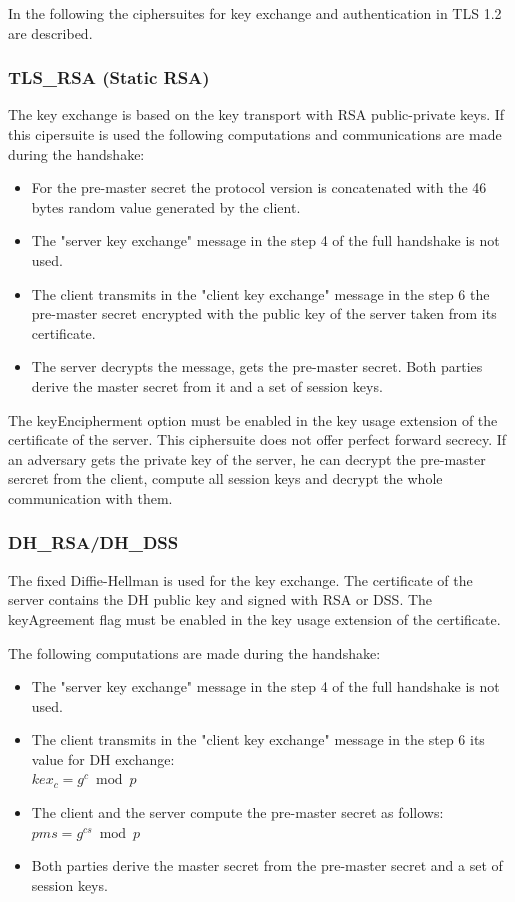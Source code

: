 In the following the ciphersuites for key exchange and authentication in TLS 1.2 are described.

\subsubsection*{TLS\_RSA (Static RSA)} 
The key exchange is based on the key transport with RSA public-private keys.
If this cipersuite is used the following computations and communications are made during the handshake:
\begin{itemize}
	\item For the pre-master secret the protocol version is concatenated with the 46 bytes random value generated by the client.
	\item The "server key exchange" message in the step 4 of the full handshake is not used.
	\item The client transmits in the "client key exchange" message in the step 6 the pre-master secret encrypted with the public key of the server taken from its certificate.
	\item The server decrypts the message, gets the pre-master secret. Both parties derive the master secret from it and a set of session keys.
\end{itemize}

The keyEncipherment option must be enabled in the key usage extension of the certificate of the server.
This ciphersuite does not offer perfect forward secrecy. If an adversary gets the private key of the server, he can decrypt the pre-master sercret from the client, compute all session keys and decrypt the whole communication with them.

\subsubsection*{DH\_RSA/DH\_DSS}
The fixed Diffie-Hellman is used for the key exchange. The certificate of the server contains the DH public key and signed with RSA or DSS.
The keyAgreement flag must be enabled in the key usage extension of the certificate.

The following computations are made during the handshake:
\begin{itemize}
	\item The "server key exchange" message in the step 4 of the full handshake is not used.
	\item The client transmits in the "client key exchange" message in the step 6 its value for DH exchange: \\ $\displaystyle kex_c = g^c \bmod p $ 
	\item The client and the server compute the pre-master secret as follows: $\displaystyle pms = g^{cs} \bmod p$
	\item Both parties derive the master secret from the pre-master secret and a set of session keys.
\end{itemize}

